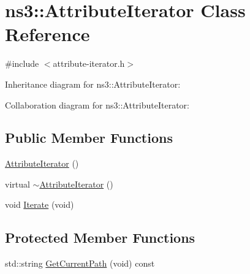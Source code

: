 \hypertarget{classns3_1_1AttributeIterator}{}\section{ns3\+:\+:Attribute\+Iterator Class Reference}
\label{classns3_1_1AttributeIterator}


{\ttfamily \#include $<$attribute-\/iterator.\+h$>$}



Inheritance diagram for ns3\+:\+:Attribute\+Iterator\+:


Collaboration diagram for ns3\+:\+:Attribute\+Iterator\+:
\subsection*{Public Member Functions}
\begin{DoxyCompactItemize}
\item 
\hyperlink{classns3_1_1AttributeIterator_a404e53c26e120d55b6c09e39e2a2fa5a}{Attribute\+Iterator} ()
\item 
virtual \hyperlink{classns3_1_1AttributeIterator_a8c8285bb6e9dcbbeda8897b5929c30b9}{$\sim$\+Attribute\+Iterator} ()
\item 
void \hyperlink{classns3_1_1AttributeIterator_a8e7de38f441cc482c2d507e2a4927b8c}{Iterate} (void)
\end{DoxyCompactItemize}
\subsection*{Protected Member Functions}
\begin{DoxyCompactItemize}
\item 
std\+::string \hyperlink{classns3_1_1AttributeIterator_a94f13487a30602c2a14360b16936e0cf}{Get\+Current\+Path} (void) const 
\end{DoxyCompactItemize}
